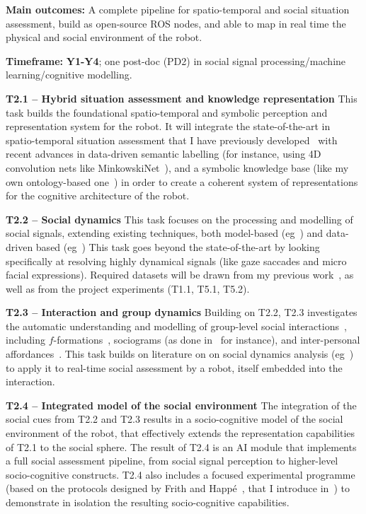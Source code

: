 \documentclass[11pt,a4paper]{report}
\begin{document}
\begin{framed}
    \textbf{Main outcomes:} A complete pipeline for spatio-temporal and social
    situation assessment, build as open-source ROS nodes, and able to map in
    real time the physical and social environment of the robot.

    \textbf{Timeframe:} \textbf{Y1-Y4}; one post-doc (PD2) in social
signal processing/machine learning/cognitive modelling.
\end{framed}

\textbf{T2.1 -- Hybrid situation assessment and knowledge representation} This
task builds the foundational spatio-temporal and symbolic perception and
representation system for the robot. It will integrate the state-of-the-art in
spatio-temporal situation assessment that I have previously
developed~\cite{lemaignan2018underworlds, sallami2019simulation} with recent
advances in data-driven semantic labelling (for instance, using 4D convolution
nets like MinkowskiNet~\cite{choy20194d}), and a symbolic knowledge base (like
my own ontology-based one~\cite{lemaignan2010oro}) in order to create a coherent
system of representations for the cognitive architecture of the robot.

\textbf{T2.2 -- Social dynamics} This task focuses on the processing and
modelling of social signals, extending existing techniques, both model-based
(eg~\cite{gunes2017automatic,lemaignan2016realtime}) and
data-driven based (eg~\cite{bartlett2019what}) This task goes beyond the state-of-the-art by
looking specifically at resolving highly dynamical signals (like gaze saccades
and micro facial expressions). Required datasets will be drawn from my previous
work~\cite{lemaignan2018pinsoro}, as well as from the project experiments (T1.1,
T5.1, T5.2).

\textbf{T2.3 -- Interaction and group dynamics} Building on T2.2, T2.3
investigates the automatic understanding and modelling of group-level social
interactions~\cite{tapus2019perceiving}, including
$f$-formations~\cite{marshall2011using}, sociograms (as done
in~\cite{garcia2016hybrid} for instance), and inter-personal
affordances~\cite{pandey2013affordance}. This task builds on literature on on
social dynamics analysis (eg~\cite{durantin2017social,jermann2009physical,
martinez2019collocated}) to apply it to real-time social assessment by a robot,
itself embedded into the interaction.

\textbf{T2.4 -- Integrated model of the social environment} The integration of
the social cues from T2.2 and T2.3 results in a socio-cognitive model of the
social environment of the robot, that effectively extends the representation
capabilities of T2.1 to the social sphere. The result of T2.4 is an AI module
that implements a full social assessment pipeline, from social signal perception
to higher-level socio-cognitive constructs. T2.4 also includes a
focused experimental programme (based on the protocols designed by Frith and
Happé~\cite{frith1994autism}, that I introduce in~\cite{lemaignan2015mutual}) to
demonstrate in isolation the resulting socio-cognitive capabilities.
\end{document}
